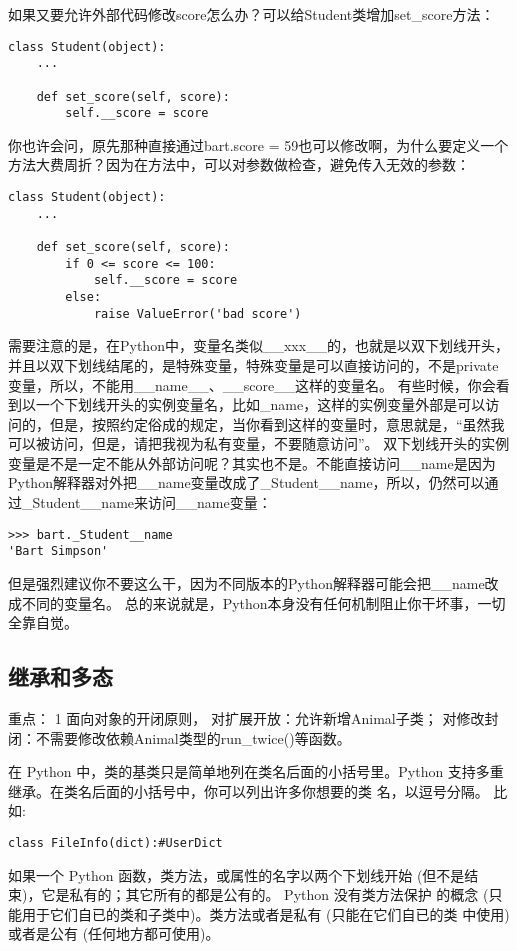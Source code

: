 \documentclass[twoside,11pt]{book}
\begin{document}
如果又要允许外部代码修改score怎么办？可以给Student类增加set\_score方法：
\begin{lstlisting}
class Student(object):
    ...

    def set_score(self, score):
        self.__score = score
\end{lstlisting}

你也许会问，原先那种直接通过bart.score = 59也可以修改啊，为什么要定义一个方法大费周折？因为在方法中，可以对参数做检查，避免传入无效的参数：
\begin{lstlisting}
class Student(object):
    ...

    def set_score(self, score):
        if 0 <= score <= 100:
            self.__score = score
        else:
            raise ValueError('bad score')
\end{lstlisting}

需要注意的是，在Python中，变量名类似\_\_xxx\_\_的，也就是以双下划线开头，并且以双下划线结尾的，是特殊变量，特殊变量是可以直接访问的，不是private变量，所以，不能用\_\_name\_\_、\_\_score\_\_这样的变量名。
有些时候，你会看到以一个下划线开头的实例变量名，比如\_name，这样的实例变量外部是可以访问的，但是，按照约定俗成的规定，当你看到这样的变量时，意思就是，“虽然我可以被访问，但是，请把我视为私有变量，不要随意访问”。
双下划线开头的实例变量是不是一定不能从外部访问呢？其实也不是。不能直接访问\_\_name是因为Python解释器对外把\_\_name变量改成了\_Student\_\_name，所以，仍然可以通过\_Student\_\_name来访问\_\_name变量：
\begin{lstlisting}
>>> bart._Student__name
'Bart Simpson'
\end{lstlisting}

但是强烈建议你不要这么干，因为不同版本的Python解释器可能会把\_\_name改成不同的变量名。
总的来说就是，Python本身没有任何机制阻止你干坏事，一切全靠自觉。

\subsection{继承和多态}
重点：
1 面向对象的开闭原则，
对扩展开放：允许新增Animal子类；
对修改封闭：不需要修改依赖Animal类型的run\_twice()等函数。

在 Python 中，类的基类只是简单地列在类名后面的小括号里。Python 支持多重继承。在类名后面的小括号中，你可以列出许多你想要的类 名，以逗号分隔。
比如:
\begin{lstlisting}
class FileInfo(dict):#UserDict
\end{lstlisting}

如果一个 Python 函数，类方法，或属性的名字以两个下划线开始 (但不是结 束)，它是私有的；其它所有的都是公有的。 Python 没有类方法保护 的概念 (只能用于它们自已的类和子类中)。类方法或者是私有 (只能在它们自已的类 中使用) 或者是公有 (任何地方都可使用)。
\end{document}
